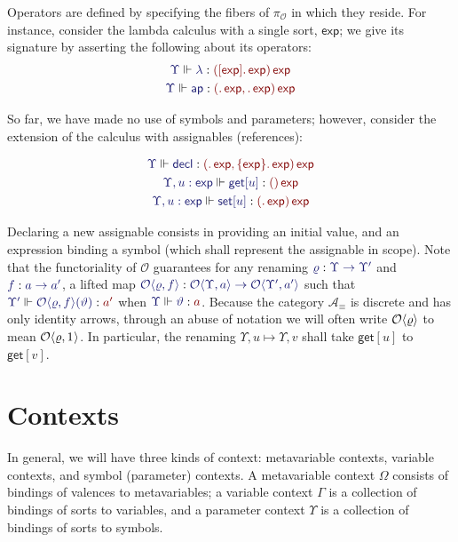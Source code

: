 \documentclass[11pt]{article}
\theoremstyle{definition}
\theoremstyle{remark}
\numberwithin{equation}{section}
\def\IModeColorName{MidnightBlue}
\def\OModeColorName{Maroon}
\newcommand\IMode[1]{{\color{\IModeColorName}{#1}}}
\newcommand\OMode[1]{{\color{\OModeColorName}{#1}}}
\newcommand\Of[2]{\IMode{#1} : \IMode{#2}}
\newcommand\MkValence[3]{%
  \ifthenelse{\equal{#1}{}}{}{%
    \{#1\}%
  }%
  \ifthenelse{\equal{#2}{}}{}{%
    [#2]%
  }.\, #3
}
\newcommand\MkArity[2]{(#1)\, #2}
\newcommand\ArrId[1]{1_{#1}}
\newcommand\Arities{\mathcal{A}}
\newcommand\Operators{\mathcal{O}}
\newcommand\Discrete[1]{#1_{\equiv}}
\newcommand\IsOperator[3]{\IMode{#1}\Vdash \IMode{#2} : \OMode{#3}}
\newcommand\Pair[2]{\langle #1, #2 \rangle}
\newcommand\FLift[2]{
  \Operators\langle#1%
  \ifthenelse{\equal{#2}{}}{}{, #2}\rangle
}
\newcommand\SortExp{\mathsf{exp}}
\begin{document}
Operators are defined by specifying the fibers of $\pi_{\Operators}$ in which
they reside. For instance, consider the lambda calculus with a single sort,
$\SortExp$; we give its signature by asserting the following about its
operators:
\begin{gather*}
  \IsOperator{\Upsilon}{\lambda}{
    \MkArity{\MkValence{}{\SortExp}{\SortExp}}{\SortExp}
  }\\
  \IsOperator{\Upsilon}{\mathsf{ap}}{
    \MkArity{
      \MkValence{}{}{\SortExp},
      \MkValence{}{}{\SortExp}
    }{\SortExp}
  }
\end{gather*}

So far, we have made no use of symbols and parameters; however, consider the
extension of the calculus with assignables (references):

\begin{gather*}
  \IsOperator{\Upsilon}{\mathsf{decl}}{
    \MkArity{
      \MkValence{}{}{\SortExp},
      \MkValence{\SortExp}{}{\SortExp}
    }{
      \SortExp
    }
  }\\
  \IsOperator{\Upsilon,u:\SortExp}{\mathsf{get}[u]}{
    \MkArity{}{\SortExp}
  }\\
  \IsOperator{\Upsilon,u:\SortExp}{\mathsf{set}[u]}{
    \MkArity{
      \MkValence{}{}{\SortExp}
    }{
      \SortExp
    }
  }
\end{gather*}

Declaring a new assignable consists in providing an initial value, and an
expression binding a symbol (which shall represent the assignable in scope).
Note that the functoriality of $\Operators$ guarantees for any renaming
$\Of{\varrho}{\Upsilon\to\Upsilon'}$ and $\Of{f}{a\to a'}$, a lifted map
$\Of{\FLift{\varrho}{f}}{\Operators\Pair{\Upsilon}{a}\to\Operators\Pair{\Upsilon'}{a'}}$
such that $\IsOperator{\Upsilon'}{\FLift{\varrho}{f}(\vartheta)}{a'}$ when
$\IsOperator{\Upsilon}{\vartheta}{a}$. Because the category
$\Discrete{\Arities}$ is discrete and has only identity arrows, through an abuse
of notation we will often write $\FLift{\varrho}{}$ to mean
$\FLift{\varrho}{\ArrId{}}$. In particular, the renaming
$\Upsilon,u\mapsto\Upsilon,v$ shall take $\mathsf{get}[u]$ to $\mathsf{get}[v]$.

\section{Contexts}

In general, we will have three kinds of context: metavariable contexts,
variable contexts, and symbol (parameter) contexts. A metavariable context
$\Omega$ consists of bindings of valences to metavariables; a variable context
$\Gamma$ is a collection of bindings of sorts to variables, and a parameter
context $\Upsilon$ is a collection of bindings of sorts to symbols.
\end{document}
